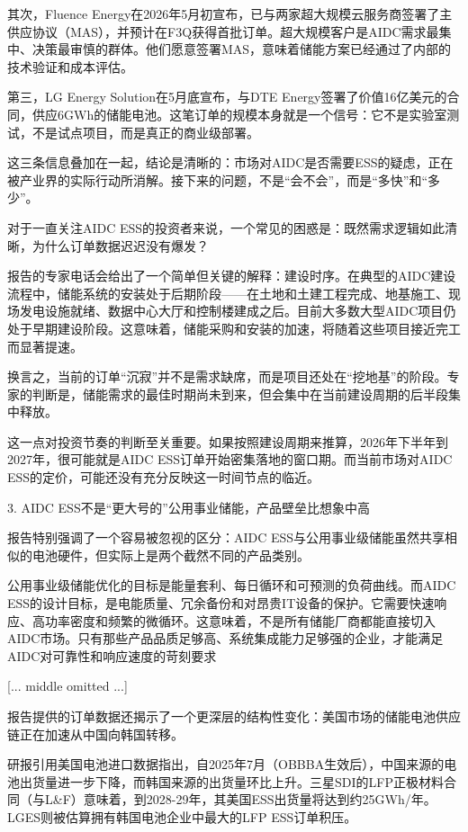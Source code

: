 \documentclass[11pt]{ctexart}
\begin{document}
其次，Fluence Energy在2026年5月初宣布，已与两家超大规模云服务商签署了主供应协议（MAS），并预计在F3Q获得首批订单。超大规模客户是AIDC需求最集中、决策最审慎的群体。他们愿意签署MAS，意味着储能方案已经通过了内部的技术验证和成本评估。

第三，LG Energy Solution在5月底宣布，与DTE Energy签署了价值16亿美元的合同，供应6GWh的储能电池。这笔订单的规模本身就是一个信号：它不是实验室测试，不是试点项目，而是真正的商业级部署。

这三条信息叠加在一起，结论是清晰的：市场对AIDC是否需要ESS的疑虑，正在被产业界的实际行动所消解。接下来的问题，不是“会不会”，而是“多快”和“多少”。

对于一直关注AIDC ESS的投资者来说，一个常见的困惑是：既然需求逻辑如此清晰，为什么订单数据迟迟没有爆发？

报告的专家电话会给出了一个简单但关键的解释：建设时序。在典型的AIDC建设流程中，储能系统的安装处于后期阶段——在土地和土建工程完成、地基施工、现场发电设施就绪、数据中心大厅和控制楼建成之后。目前大多数大型AIDC项目仍处于早期建设阶段。这意味着，储能采购和安装的加速，将随着这些项目接近完工而显著提速。

换言之，当前的订单“沉寂”并不是需求缺席，而是项目还处在“挖地基”的阶段。专家的判断是，储能需求的最佳时期尚未到来，但会集中在当前建设周期的后半段集中释放。

这一点对投资节奏的判断至关重要。如果按照建设周期来推算，2026年下半年到2027年，很可能就是AIDC ESS订单开始密集落地的窗口期。而当前市场对AIDC ESS的定价，可能还没有充分反映这一时间节点的临近。

3. AIDC ESS不是“更大号的”公用事业储能，产品壁垒比想象中高

报告特别强调了一个容易被忽视的区分：AIDC ESS与公用事业级储能虽然共享相似的电池硬件，但实际上是两个截然不同的产品类别。

公用事业级储能优化的目标是能量套利、每日循环和可预测的负荷曲线。而AIDC ESS的设计目标，是电能质量、冗余备份和对昂贵IT设备的保护。它需要快速响应、高功率密度和频繁的微循环。这意味着，不是所有储能厂商都能直接切入AIDC市场。只有那些产品品质足够高、系统集成能力足够强的企业，才能满足AIDC对可靠性和响应速度的苛刻要求

[... middle omitted ...]


报告提供的订单数据还揭示了一个更深层的结构性变化：美国市场的储能电池供应链正在加速从中国向韩国转移。

研报引用美国电池进口数据指出，自2025年7月（OBBBA生效后），中国来源的电池出货量进一步下降，而韩国来源的出货量环比上升。三星SDI的LFP正极材料合同（与L\&F）意味着，到2028-29年，其美国ESS出货量将达到约25GWh/年。LGES则被估算拥有韩国电池企业中最大的LFP ESS订单积压。
\end{document}
